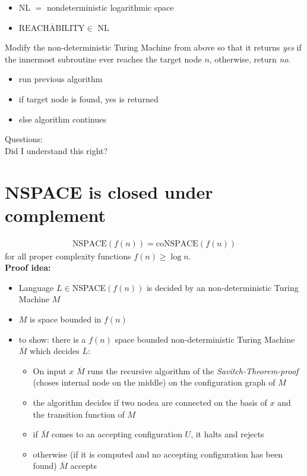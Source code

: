 \documentclass[a4]{scrartcl}
\begin{document}
\begin{itemize}
\item NL $=$ nondeterministic logarithmic space
\item $\overline{\text{REACHABILITY}} \in$ NL
\end{itemize}


Modify the non-deterministic Turing Machine from above so that it returns \textit{yes} if the innermost subroutine ever reaches the target node $n$, otherwise, return \textit{no}.

\begin{itemize}
\item run previous algorithm
\item if target node is found, yes is returned
\item else algorithm continues
\end{itemize}

\color{violet} Questions: \\
Did I understand this right?
\color{black}



\section*{NSPACE is closed under complement}

\begin{align*}
\text{NSPACE}(f(n)) = \text{coNSPACE}(f(n))
\end{align*}
for all proper complexity functions $f(n) \geq \log n$. \\

\textbf{Proof idea:}
\begin{itemize}
\item Language $L \in $NSPACE$(f(n))$ is decided by an non-deterministic Turing Machine $M$
\item $M$ is space bounded in $f(n)$
\item to show: there is a $f(n)$ space bounded non-deterministic Turing Machine $\overline{M}$ which decides $\overline{L}$:
\begin{itemize}
\item On input $x$ $\overline{M}$ runs the recursive algorithm of the \textit{Savitch-Theorem-proof} (choses internal node on the middle) on the configuration graph of $M$
\item the algorithm decides if two nodea are connected on the basis of $x$ and the transition function of $M$
\item if $\overline{M}$ comes to an accepting configuration $U$, it halts and rejects
\item otherwise (if it is computed and no accepting configuration has been found) $\overline{M}$ accepts
\end{itemize}

\end{itemize}





\newpage

\printbibliography
\end{document}
